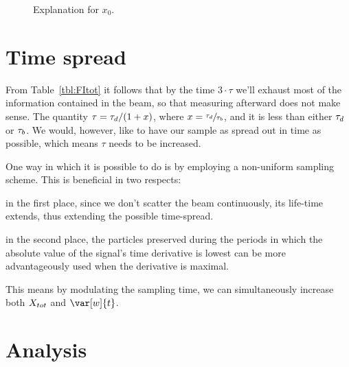 \documentclass{article}
\begin{document}
\begin{figure}[h]
	\centering
	\caption{Explanation for $x_0$\label{fig:x0Expl}.}
\end{figure}

\section{Time spread}

From Table~\ref{tbl:FItot} it follows that by the time $3\cdot \tau$ we'll exhaust most of the information contained in the beam, so that measuring afterward does not make sense. The quantity $\tau = \tau_d/(1+x)$, where $x=\sfrac{\tau_d}{\tau_b}$, and it is less than either $\tau_d$ or $\tau_b$. We would, however, like to have our sample as spread out in time as possible, which means $\tau$ needs to be increased.

One way in which it is possible to do is by employing a non-uniform sampling scheme. This is beneficial in two respects:
\begin{inparaenum}[1)]
	\item in the first place, since we don't scatter the beam continuously, its life-time extends, thus extending the possible time-spread.
	\item in the second place, the particles preserved during the periods in which the absolute value of the signal's time derivative is lowest can be more advantageously used when the derivative is maximal.
\end{inparaenum} 

This means by modulating the sampling time, we can simultaneously increase both $\stat*$ and $\var[w]{t}$.

\section{Analysis}
\end{document}
